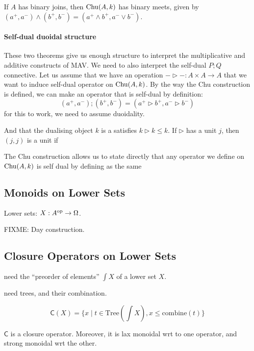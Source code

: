 \begin{theorem}
  If $A$ has binary joins, then $\mathrm{Chu}(A, k)$ has binary meets, given
  by $(a^+,a^-) \land (b^+,b^-) = (a^+ \land b^+, a^- \lor b^-)$.
\end{theorem}

\paragraph{Self-dual duoidal structure}
These two theorems give us enough structure to interpret the
multiplicative and additive constructs of MAV. We need to also
interpret the self-dual $P; Q$ connective. Let us assume that we have
an operation $-\rhd- : A \times A \to A$ that we want to induce
self-dual operator on $\mathrm{Chu}(A, k)$. By the way the Chu construction is
defined, we can make an operator that is self-dual by definition:
\begin{displaymath}
  (a^+, a^-) ; (b^+, b^-) = (a^+ \rhd b^+, a^- \rhd b^-)
\end{displaymath}
for this to work, we need to assume duoidality.

And that the dualising object $k$ is a
satisfies $k \rhd k \leq k$. If $\rhd$ has a unit $j$, then $(j, j)$ is a unit if


The Chu construction allows us to state
directly that any operator we define on $\mathrm{Chu}(A, k)$ is self dual by
defining as the same

\subsection{Monoids on Lower Sets}

Lower sets: $X : A^{\mathrm{op}} \to \Omega$.

\begin{proposition}
  FIXME: Day construction.
\end{proposition}

\subsection{Closure Operators on Lower Sets}

need the ``preorder of elements'' $\int X$ of a lower set $X$.

need trees, and their combination.


\begin{displaymath}
  \mathsf{C}(X) = \{ x \mid t \in \mathrm{Tree}(\int X), x \leq \mathrm{combine}(t) \}
\end{displaymath}

\begin{theorem}
  $\mathsf{C}$ is a closure operator. Moreover, it is lax monoidal wrt
  to one operator, and strong monoidal wrt the other.
\end{theorem}
